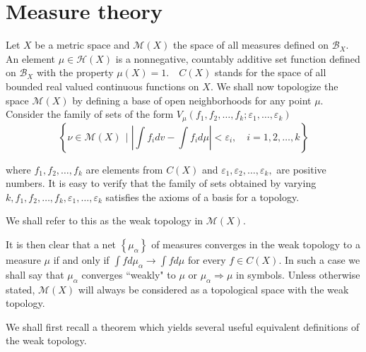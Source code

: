 \section{Measure theory}

Let \( X \) be a metric space and \( \mathscr { M } ( X ) \) the space of all measures defined on \( \mathscr { B } _ { X } . \) An element \( \mu \in \mathscr { H } ( X ) \) is a nonnegative, countably additive set function defined on \( \mathscr { B } _ { X } \) with the property \( \mu ( X ) = 1 . \quad C ( X ) \) stands for the space of all bounded real valued continuous functions on \( X \). We shall now topologize the space \( \mathscr { M } ( X ) \) by defining a base of open neighborhoods for any point \( \mu . \) Consider the family of sets of the form
\( V _ { \mu } \left( f _ { 1 } , f _ { 2 } , \ldots , f _ { k } ; \varepsilon _ { 1 } , \ldots , \varepsilon _ { k } \right) \)
\[ \left\{\nu \in \mathscr { M } ( X ) \, \mid  \left| \int f _ { i } d v - \int f _ { i } d \mu \right| < \varepsilon _ { i } , \quad i = 1,2 , \ldots , k \right\} \]

where \( f _ { 1 } , f _ { 2 } , \ldots , f _ { k } \) are elements from \( C ( X ) \) and \( \varepsilon _ { 1 } , \varepsilon _ { 2 } , \ldots , \varepsilon _ { k } , \) are positive numbers. It is easy to verify that the family of sets obtained by varying \( k , f _ { 1 } , f _ { 2 } , \ldots , f _ { k } , \varepsilon _ { 1 } , \ldots , \varepsilon _ { k } \) satisfies the axioms of a basis for a topology.

\begin{defn}
	We shall refer to this as the weak topology  in \( \mathscr { M } ( X ) \).
\end{defn}

It is then clear that a net \( \left\{ \mu _ { \alpha } \right\} \) of measures converges in the weak topology to a measure \( \mu \) if and only if \( \int f d \mu _ { \alpha } \rightarrow \int f d \mu \) for every \( f \in C ( X ) . \) In such a case we shall say that \( \mu _ { \alpha } \) converges ``weakly" to \( \mu \) or \( \mu _ { \alpha } \Rightarrow \mu \) in symbols. Unless otherwise stated, \( \mathscr { M } ( X ) \) will always be considered as a topological space with the weak topology.

We shall first recall a theorem which yields several useful equivalent definitions of the weak topology.

